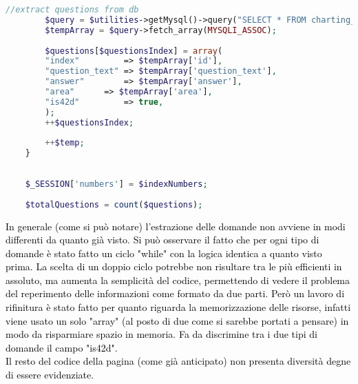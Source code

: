 \begin{lstlisting}[language=php]
		//extract questions from db
		$query = $utilities->getMysql()->query("SELECT * FROM charting_test_42d WHERE (id = '{$indexNumbers['42d'][$temp]}')");
		$tempArray = $query->fetch_array(MYSQLI_ASSOC);  
		
		$questions[$questionsIndex] = array(
		"index"         => $tempArray['id'],
		"question_text" => $tempArray['question_text'],
		"answer"        => $tempArray['answer'],
		"area"		=> $tempArray['area'],	
		"is42d"         => true,
		);
		++$questionsIndex;
		
		++$temp;
	}
	
	
	$_SESSION['numbers'] = $indexNumbers;
	
	$totalQuestions = count($questions);
\end{lstlisting}
\textcolor{black}{In generale (come si può notare) l'estrazione delle domande non avviene in modi differenti da quanto già visto. Si può osservare il fatto che per ogni tipo di domande è stato fatto un ciclo "while" con la logica identica a quanto visto prima. La scelta di un doppio ciclo potrebbe non risultare tra le più efficienti in assoluto, ma aumenta la semplicità del codice, permettendo di vedere il problema del reperimento delle informazioni come formato da due parti. Però un lavoro di rifinitura è stato fatto per quanto riguarda la memorizzazione delle risorse, infatti viene usato un solo "array" (al posto di due come si sarebbe portati a pensare) in modo da risparmiare spazio in memoria. Fa da discrimine tra i due tipi di domande il campo "is42d".\\
Il resto del codice della pagina (come già anticipato) non presenta diversità degne di essere evidenziate.}\\

